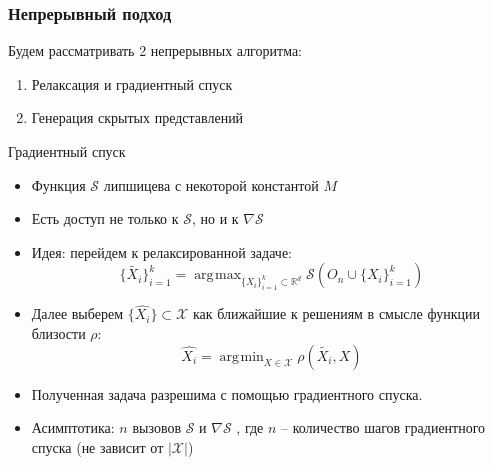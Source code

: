 \documentclass[10pt]{beamer}
\DeclareMathOperator*{\argmax}{\arg\!\max}
\DeclareMathOperator*{\argmin}{\arg\!\min}
\begin{document}
\begin{frame}
	\frametitle{Непрерывный подход}
		Будем рассматривать 2 непрерывных алгоритма:
		\begin{enumerate}	
			\item Релаксация и градиентный спуск
			\item Генерация скрытых представлений
		\end{enumerate}
		
		\begin{block}{Градиентный спуск}
			\begin{itemize}
				\item Функция $\mathcal{S}$ липшицева с некоторой константой $M$
				\item Есть доступ не только к $\mathcal{S}$, но и к $\nabla\mathcal{S}$ 
				\item Идея: перейдем к релаксированной задаче:
				 	$$\{\tilde{X_i}\}_{i=1}^k= \argmax_{\{X_i\}_{i=1}^k\subset\mathbb{R}^d} \mathcal{S}\left(O_n\cup\{X_i\}_{i=1}^k\right)$$
		 \item Далее выберем $\{\hat{X_i}\}\subset\mathcal{X}$ как ближайшие к решениям  в смысле функции близости $\rho$:
		 \vspace{-0.3cm}
		 $$\hat{X_i} =  \argmin_{X\in\mathcal{X}} \rho(\tilde{X_i}, X)$$
		  \vspace{-0.5cm}
		 \item Полученная задача разрешима с помощью градиентного спуска.
		 \item Асимптотика: $n$ вызовов $\mathcal{S}$ и $\nabla\mathcal{S}$ , где $n$ -- количество шагов градиентного спуска (не зависит от $|\mathcal{X}|$)
			\end{itemize}
		\end{block}
\end{frame}
\end{document}
